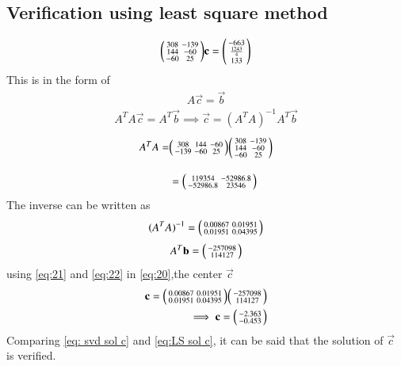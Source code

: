 \documentclass[journal,12pt,twocolumn]{IEEEtran}
\begin{document}
\subsection{Verification using least square method}
\begin{align}
	\begin{psmallmatrix}308 & -139\\144 & -60\\ -60 & 25\end{psmallmatrix}\mathbf{c}=\begin{psmallmatrix}-663\\\frac{1243}{4}\\133\end{psmallmatrix}
\end{align}
This is in the form of 
\begin{align}
 {A}\vec{c}=\vec{b}
 \end{align}
  \begin{align} 
 {A}^T{A}\vec{c}={A}^T\vec{b}
 \implies \vec{c}=  ({{A}^T{A}})^{-1} {A}^T\vec{b} \label{eq:20}
\end{align}
\begin{align}
{A}^T{A}=& \begin{psmallmatrix}308 & 144 & -60\\ -139 & -60 & 25\end{psmallmatrix} \begin{psmallmatrix}308 & -139\\144 & -60\\ -60 & 25\end{psmallmatrix}\\[1em]
&= \begin{psmallmatrix}119354 & -52986.8\\ -52986.8 & 23546\end{psmallmatrix}
\end{align}
The inverse can be written as
\begin{align}
    ({{A}^T{A}})^{-1}=
    \begin{psmallmatrix}0.00867 & 0.01951\\0.01951 & 0.04395\end{psmallmatrix}\label{eq:21}
\end{align} 
\begin{align}
   {A}^T\mathbf{b} =\begin{psmallmatrix}-257098 \\ 114127\end{psmallmatrix} \label{eq:22}
\end{align}
using \ref{eq:21} and \ref{eq:22} in \ref{eq:20},the center $\vec{c}$
\begin{align}
    \mathbf{c}=
    \begin{psmallmatrix}0.00867 & 0.01951\\0.01951 & 0.04395\end{psmallmatrix}\begin{psmallmatrix}-257098 \\ 114127\end{psmallmatrix} \\
    \implies \mathbf{c}=\begin{psmallmatrix}-2.363 \\ -0.453\end{psmallmatrix}\label{eq:LS sol c}  
\end{align}
Comparing \eqref{eq: svd sol c} and \eqref{eq:LS sol c}, it can be said that the solution of $\vec c$ is verified.
\end{document}
